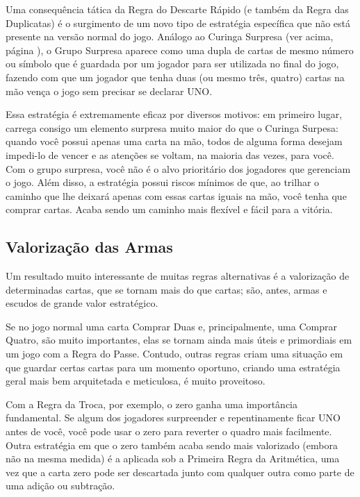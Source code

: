 \label{gruposurpresa}

Uma consequência tática da Regra do Descarte Rápido (e também da Regra das Duplicatas) é o surgimento de um novo tipo de estratégia específica que não está presente na versão normal do jogo. Análogo ao Curinga Surpresa (ver acima, página \pageref{curingasurpresa}), o Grupo Surpresa aparece como uma dupla de cartas de mesmo número ou símbolo que é guardada por um jogador para ser utilizada no final do jogo, fazendo com que um jogador que tenha duas (ou mesmo três, quatro) cartas na mão vença o jogo sem precisar se declarar UNO.

Essa estratégia é extremamente eficaz por diversos motivos: em primeiro lugar, carrega consigo um elemento surpresa muito maior do que o Curinga Surpesa: quando você possui apenas uma carta na mão, todos de alguma forma desejam impedi-lo de vencer e as atenções se voltam, na maioria das vezes, para você. Com o grupo surpresa, você não é o alvo prioritário dos jogadores que gerenciam o jogo. Além disso, a estratégia possui riscos mínimos de que, ao trilhar o caminho que lhe deixará apenas com essas cartas iguais na mão, você tenha que comprar cartas. Acaba sendo um caminho mais flexível e fácil para a vitória.

\subsection{Valorização das Armas}

\label{armas}

Um resultado muito interessante de muitas regras alternativas é a valorização de determinadas cartas, que se tornam mais do que cartas; são, antes, armas e escudos de grande valor estratégico.

Se no jogo normal uma carta Comprar Duas e, principalmente, uma Comprar Quatro, são muito importantes, elas se tornam ainda mais úteis e primordiais em um jogo com a Regra do Passe. Contudo, outras regras criam uma situação em que guardar certas cartas para um momento oportuno, criando uma estratégia geral mais bem arquitetada e meticulosa, é muito proveitoso.

Com a Regra da Troca, por exemplo, o zero ganha uma importância fundamental. Se algum dos jogadores surpreender e repentinamente ficar UNO antes de você, você pode usar o zero para reverter o quadro mais facilmente. Outra estratégia em que o zero também acaba sendo mais valorizado (embora não na mesma medida) é a aplicada sob a Primeira Regra da Aritmética, uma vez que a carta zero pode ser descartada junto com qualquer outra como parte de uma adição ou subtração.

